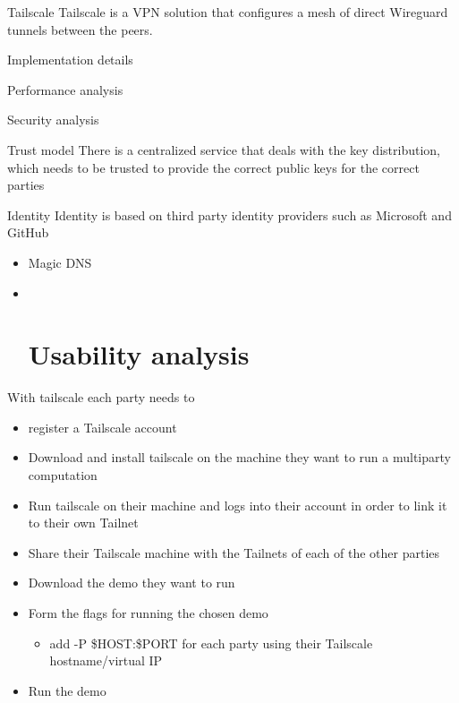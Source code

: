 \begin{frame}{Tailscale}
\protect\hypertarget{tailscale}{}
Tailscale is a VPN solution that configures a mesh of direct Wireguard
tunnels between the peers.

\begin{block}{Implementation details}
\protect\hypertarget{implementation-details}{}
\end{block}

\begin{block}{Performance analysis}
\protect\hypertarget{performance-analysis}{}
\end{block}

\begin{block}{Security analysis}
\protect\hypertarget{security-analysis}{}
\begin{block}{Trust model}
\protect\hypertarget{trust-model}{}
There is a centralized service that deals with the key distribution,
which needs to be trusted to provide the correct public keys for the
correct parties
\end{block}

\begin{block}{Identity}
\protect\hypertarget{identity}{}
Identity is based on third party identity providers such as Microsoft
and GitHub

\begin{itemize}
\item
  Magic DNS
\item ~
  \hypertarget{usability-analysis}{%
  \section{Usability analysis}\label{usability-analysis}}
\end{itemize}

With tailscale each party needs to

\begin{itemize}
\tightlist
\item
  register a Tailscale account
\item
  Download and install tailscale on the machine they want to run a
  multiparty computation
\item
  Run tailscale on their machine and logs into their account in order to
  link it to their own Tailnet
\item
  Share their Tailscale machine with the Tailnets of each of the other
  parties
\item
  Download the demo they want to run
\item
  Form the flags for running the chosen demo

  \begin{itemize}
  \tightlist
  \item
    add -P \$HOST:\$PORT for each party using their Tailscale
    hostname/virtual IP
  \end{itemize}
\item
  Run the demo
\end{itemize}
\end{block}
\end{block}
\end{frame}

